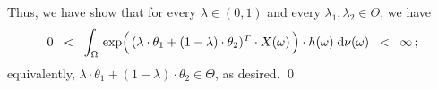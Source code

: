 Thus, we have show that for every $\lambda \in (0,1)$ and every $\lambda_{1}, \lambda_{2} \in \Theta$, we have
\begin{equation*}
0 \;\; < \;\;
	\int_{\Omega}\,
		\exp\!\left(\,
			(\lambda\cdot\theta_{1}+(1-\lambda)\cdot\theta_{2})^{T}
			\!\overset{{\color{white}-}}{\cdot}\!
			X(\omega)
		\,\right)
		\cdot
	 	h(\omega)
	\;\d\nu(\omega)
\;\; < \;\; \infty\,;
\end{equation*}
equivalently, $\lambda\cdot\theta_{1}+(1-\lambda)\cdot\theta_{2} \in \Theta$, as desired.
\qed


\renewcommand{\theenumi}{\roman{enumi}}
\renewcommand{\labelenumi}{\textnormal{(\theenumi)}$\;\;$}

